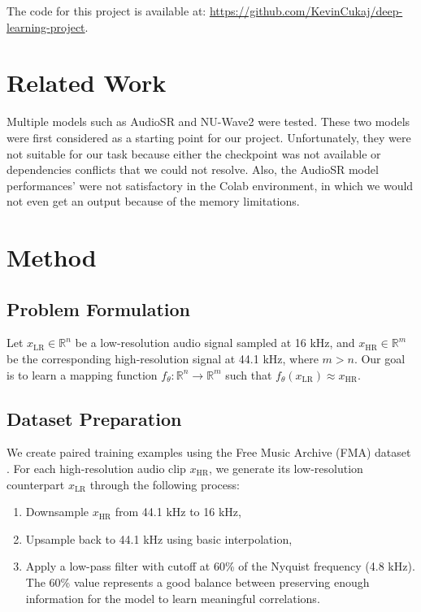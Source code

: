 \documentclass{article}
\begin{document}
The code for this project is available at: \url{https://github.com/KevinCukaj/deep-learning-project}.

\section{Related Work}

Multiple models such as AudioSR \cite{liu2024audiosr} and NU-Wave2 \cite{han2022nu} were tested.
These two models were first considered as a starting point for our project.
Unfortunately, they were not suitable for our task because either the checkpoint was not available or dependencies conflicts that we could not resolve.
Also, the AudioSR model performances' were not satisfactory in the Colab environment, in which we would not even get an output because of the memory limitations.

\section{Method}

\subsection{Problem Formulation}
Let $x_{\text{LR}} \in \mathbb{R}^n$ be a low-resolution audio signal sampled at 16 kHz, and $x_{\text{HR}} \in \mathbb{R}^m$ be the corresponding high-resolution signal at 44.1 kHz, where $m > n$. Our goal is to learn a mapping function $f_\theta: \mathbb{R}^n \rightarrow \mathbb{R}^m$ such that $f_\theta(x_{\text{LR}}) \approx x_{\text{HR}}$.

\subsection{Dataset Preparation}
We create paired training examples using the Free Music Archive (FMA) dataset \cite{fma_dataset}. 
For each high-resolution audio clip $x_{\text{HR}}$, we generate its low-resolution counterpart $x_{\text{LR}}$ through the following process:
\begin{enumerate}
    \item Downsample $x_{\text{HR}}$ from 44.1 kHz to 16 kHz,
    \item Upsample back to 44.1 kHz using basic interpolation,
    \item Apply a low-pass filter with cutoff at 60\% of the Nyquist frequency (4.8 kHz). The 60\% value represents a good balance between preserving enough information for the model to learn meaningful correlations.
\end{enumerate}
\end{document}
